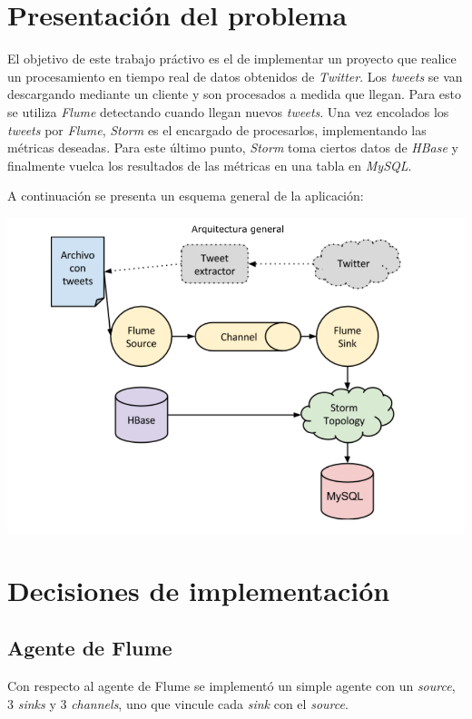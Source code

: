 \documentclass[a4paper,10pt]{article}
\begin{document}
\setcounter{page}{1}


\section{Presentación del problema}
El objetivo de este trabajo práctivo es el de implementar un proyecto que realice un procesamiento en tiempo real de datos obtenidos de \textit{Twitter}.
Los \textit{tweets} se van descargando mediante un cliente y son procesados a medida que llegan. Para esto se utiliza \textit{Flume} detectando cuando llegan nuevos \textit{tweets}.
Una vez encolados los \textit{tweets} por \textit{Flume}, \textit{Storm} es el encargado de procesarlos, implementando las métricas deseadas. Para este último punto, \textit{Storm}
toma ciertos datos de \textit{HBase} y finalmente vuelca los resultados de las métricas en una tabla en \textit{MySQL}.

A continuación se presenta un esquema general de la aplicación:

\includegraphics[width=\linewidth]{images/tp2BD.png}

\section{Decisiones de implementación}

\subsection{Agente de Flume}
Con respecto al agente de Flume se implementó un simple agente con un \textit{source}, 3 \textit{sinks} y 3 \textit{channels}, uno que vincule cada \textit{sink} con el
\textit{source}.
\end{document}
